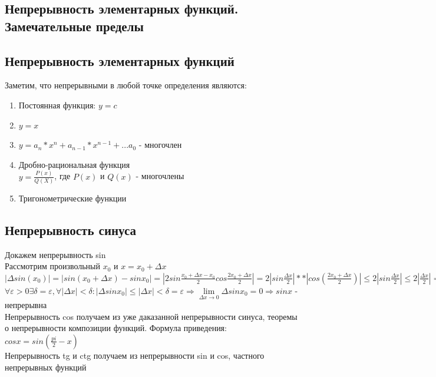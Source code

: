 \documentclass[oneside]{book}
\begin{document}
\begin{enumerate}
    \chapter{Непрерывность элементарных функций. Замечательные пределы}
\section{Непрерывность элементарных функций}
Заметим, что непрерывными в любой точке определения являются:
\begin{enumerate}
\item Постоянная функция: $y=c$
\item $y=x$
\item $y=a_n*x^n+a_{n-1}*x^{n-1}+...a_0$ - многочлен
\item Дробно-рациональная функция\\$y=\frac{P(x)}{Q(X)}$, где $P(x)$ и $Q(x)$ - многочлены
\item Тригонометрические функции
\end{enumerate}
\section{Непрерывность синуса}
Докажем непрерывность sin\\
Рассмотрим произвольный $x_0$ и $x=x_0+ \Delta x$\\
$|\Delta sin(x_0)| = |sin(x_0+ \Delta x)-sinx_0|=|2sin\frac{x_0+ \Delta x-x_0}{2}cos\frac{2x_0+ \Delta x}{2}|=2|sin\frac{\Delta x}{2}|**|cos(\frac{2x_0+\Delta x}{2})|\leq 2|sin\frac{\Delta x}{2}|\leq 2|\frac{\Delta x}{2}|=|\Delta x|\leq 1$\\
$\forall \varepsilon > 0 \exists \delta = \varepsilon, \forall |\Delta x| < \delta: |\Delta sinx_0|\leq |\Delta x| < \delta = \varepsilon \Rightarrow \lim \limits_{\Delta x \rightarrow 0}\Delta sinx_0=0\Rightarrow sinx$ - непрерывна\\
Непрерывность cos получаем из уже даказанной непрерывности синуса, теоремы о непрерывности композиции функций. Формула приведения:\\
$cosx=sin(\frac{pi}{2}-x)$\\
Непрерывность tg и ctg получаем из непрерывности sin и cos, частного непрерывных функций

\end{enumerate}
\end{document}
